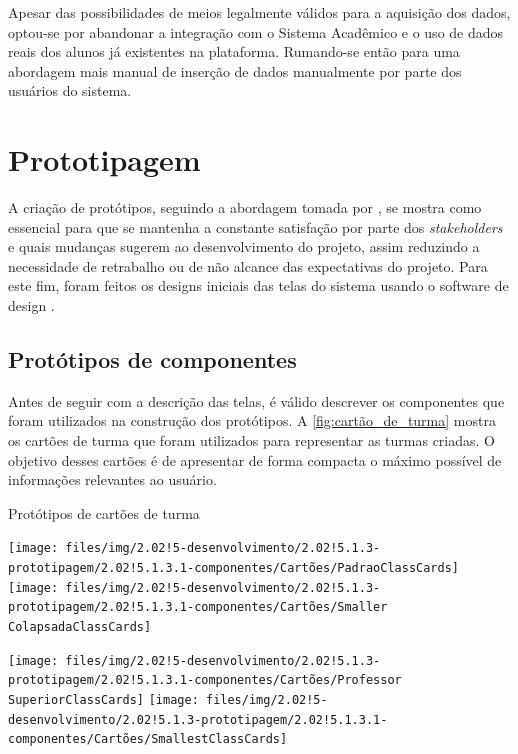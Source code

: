 Apesar das possibilidades de meios legalmente válidos para a aquisição dos dados, optou-se por abandonar a integração com o Sistema Acadêmico e o uso de dados reais dos alunos já existentes na plataforma. Rumando-se então para uma abordagem mais manual de inserção de dados manualmente por parte dos usuários do sistema.

\section{Prototipagem} \label{sec:prototipagem} %

A criação de protótipos, seguindo a abordagem tomada por , se mostra como essencial para que se mantenha a constante satisfação por parte dos \textit{stakeholders} e quais mudanças sugerem ao desenvolvimento do projeto, assim reduzindo a necessidade de retrabalho ou de não alcance das expectativas do projeto. Para este fim, foram feitos os designs iniciais das telas do sistema usando o software de design .

\subsection{Protótipos de componentes} \label{subsec:componentes} %

Antes de seguir com a descrição das telas, é válido descrever os componentes que foram utilizados na construção dos protótipos. A \autoref{fig:cartão_de_turma} mostra os cartões de turma que foram utilizados para representar as turmas criadas. O objetivo desses cartões é de apresentar de forma compacta o máximo possível de informações relevantes ao usuário.

\begin{MyCenteredFigure}
  \caption{Protótipos de cartões de turma}
  \label{fig:cartão_de_turma}
  \begin{minipage}{0.48\textwidth} \centering
    \texttt{[image: files/img/2.02!5-desenvolvimento/2.02!5.1.3-prototipagem/2.02!5.1.3.1-componentes/Cartões/PadraoClassCards]}
    \vspace{1mm} \vfill
    \texttt{[image: files/img/2.02!5-desenvolvimento/2.02!5.1.3-prototipagem/2.02!5.1.3.1-componentes/Cartões/Smaller ColapsadaClassCards]}
  \end{minipage}
  \hfill
  \begin{minipage}{0.48\textwidth} \centering
    \texttt{[image: files/img/2.02!5-desenvolvimento/2.02!5.1.3-prototipagem/2.02!5.1.3.1-componentes/Cartões/Professor SuperiorClassCards]}
    \vspace{1mm} \vfill
    \texttt{[image: files/img/2.02!5-desenvolvimento/2.02!5.1.3-prototipagem/2.02!5.1.3.1-componentes/Cartões/SmallestClassCards]}
  \end{minipage}
\end{MyCenteredFigure}

